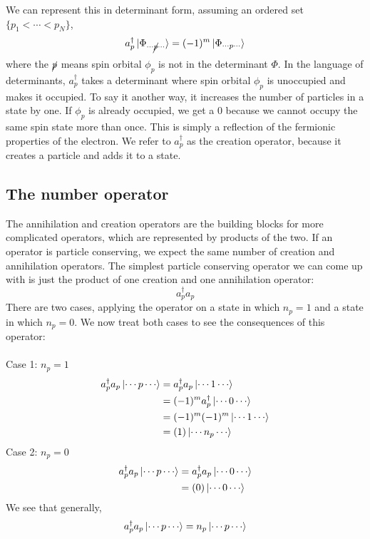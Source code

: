 \documentclass{article}
\begin{document}
We can represent this in determinant form, assuming an ordered set $\{p_1 < \cdots < p_N\}$,
\[a_p^\dagger \ket{\Phi_{\cdots \cancel{p} \cdots}} = (-1)^m  \ket{\Phi_{\cdots p \cdots }} \]
where the $\cancel{p}$ means spin orbital $\phi_p$ is not in the determinant $\Phi$.
In the language of determinants, $a_p^\dagger$ takes a determinant where spin orbital $\phi_p$ is unoccupied and makes it occupied. 
To say it another way, it increases the number of particles in a state by one. 
If $\phi_p$ is already occupied, we get a 0 because we cannot occupy the same spin state more than once. 
This is simply a reflection of the fermionic properties of the electron. 
We refer to $a_p^\dagger$ as the creation operator, because it creates a particle and adds it to a state. 

\subsection{The number operator}
The annihilation and creation operators are the building blocks for more complicated operators, which are represented by products of the two.
If an operator is particle conserving, we expect the same number of creation and annihilation operators. 
The simplest particle conserving operator we can come up with is just the product of one creation and one annihilation operator: 
\[a_p^\dagger a_p \]
There are two cases, applying the operator on a state in which $n_p = 1$ and a state in which $n_p = 0$.
We now treat both cases to see the consequences of this operator: \\
\\
Case 1: $n_p = 1$ \\
\begin{align*}
a_p^\dagger a_p \ket{\cdots p \cdots} &= a_p^\dagger a_p \ket{\cdots 1 \cdots} \\
&= (-1)^m a_p^\dagger \ket{\cdots 0 \cdots} \\
&= (-1)^m (-1)^m \ket{\cdots 1 \cdots}  \\
&= (1) \ket{\cdots n_p \cdots}  \\
\end{align*}
Case 2: $n_p = 0$ \\
\begin{align*}
a_p^\dagger a_p \ket{\cdots p \cdots} &= a_p^\dagger a_p \ket{\cdots 0 \cdots} \\
&= (0)\ket{\cdots 0 \cdots} \\
\end{align*}
We see that generally, 
\[a_p^\dagger a_p \ket{\cdots p \cdots} = n_p\ket{\cdots p \cdots}  \]
\end{document}

